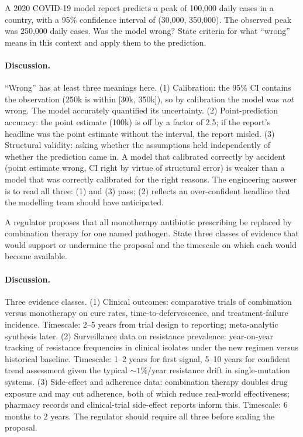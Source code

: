 \begin{exercise}
A 2020 COVID-19 model report predicts a peak of 100{,}000 daily
cases in a country, with a 95\% confidence interval of (30{,}000,
350{,}000). The observed peak was 250{,}000 daily cases. Was the
model wrong? State criteria for what ``wrong'' means in this
context and apply them to the prediction.

\paragraph{Discussion.} ``Wrong'' has at least three meanings here.
(1) Calibration: the 95\% CI contains the observation (250k is
within [30k, 350k]), so by calibration the model was \emph{not}
wrong. The model accurately quantified its uncertainty. (2)
Point-prediction accuracy: the point estimate (100k) is off by a
factor of 2.5; if the report's headline was the point estimate
without the interval, the report misled. (3) Structural validity:
asking whether the assumptions held independently of whether the
prediction came in. A model that calibrated correctly by accident
(point estimate wrong, CI right by virtue of structural error) is
weaker than a model that was correctly calibrated for the right
reasons. The engineering answer is to read all three: (1) and (3)
pass; (2) reflects an over-confident headline that the modelling
team should have anticipated.
\end{exercise}

\begin{exercise}
A regulator proposes that all monotherapy antibiotic prescribing be
replaced by combination therapy for one named pathogen. State three
classes of evidence that would support or undermine the proposal and
the timescale on which each would become available.

\paragraph{Discussion.} Three evidence classes. (1) Clinical
outcomes: comparative trials of combination versus monotherapy on
cure rates, time-to-defervescence, and treatment-failure incidence.
Timescale: 2--5 years from trial design to reporting; meta-analytic
synthesis later. (2) Surveillance data on resistance prevalence:
year-on-year tracking of resistance frequencies in clinical
isolates under the new regimen versus historical baseline.
Timescale: 1--2 years for first signal, 5--10 years for confident
trend assessment given the typical $\sim 1\%$/year resistance
drift in single-mutation systems. (3) Side-effect and adherence
data: combination therapy doubles drug exposure and may cut
adherence, both of which reduce real-world effectiveness; pharmacy
records and clinical-trial side-effect reports inform this.
Timescale: 6 months to 2 years. The regulator should require all
three before scaling the proposal.
\end{exercise}

